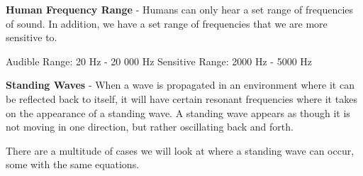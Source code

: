 \documentclass{article}
\begin{document}
\textbf{Human Frequency Range} - Humans can only hear a set range of frequencies of sound. In addition, we have a set range of frequencies that we are more sensitive to.

\vspace{-10pt}
\begin{center}
	Audible Range: 20 Hz - 20 000 Hz \qquad Sensitive Range: 2000 Hz - 5000 Hz
\end{center}

\vspace{\baselineskip}

\textbf{Standing Waves} - When a wave is propagated in an environment where it can be reflected back to itself, it will have certain resonant frequencies where it takes on the appearance of a standing wave. A standing wave appears as though it is not moving in one direction, but rather oscillating back and forth.
\begin{center}
	\hspace*{-8pt}
\end{center}

There are a multitude of cases we will look at where a standing wave can occur, some with the same equations.
\end{document}
